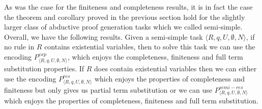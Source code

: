 As was the case for the finiteness and completeness results, it is in fact the case the theorem and corollary proved in the previous section hold for the slightly larger class of abductive proof generation tasks which we called semi-simple. Overall, we have the following results. Given a semi-simple task $\langle R,q,U,\emptyset,N\rangle$, if no rule in $R$ contains existential variables, then to solve this task we can use the encoding $P_{\langle R,q,U,\emptyset,N\rangle}^{exp}$, which enjoys the completeness, finiteness and full term substitution properties. If $R$ does contain existential variables then we can either use the encoding $P_{\langle R,q,U,\emptyset,N\rangle}^{res}$ which enjoys the properties of completeness and finiteness but only gives us partial term substitution or we can use $P_{\langle R,q,U,\emptyset,N\rangle}^{semi-res}$ which enjoys the properties of completeness, finiteness and full term substitution. 



